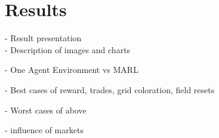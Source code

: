 %
%
\chapter{Results}\label{sec:Results}
- Result presentation \\
- Description of images and charts


- One Agent Environment vs MARL

- Best cases of reward, trades, grid coloration, field resets

- Worst cases of above

- influence of markets

